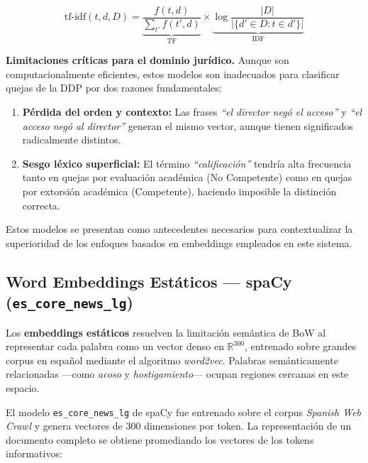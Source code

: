 \begin{equation}
  \text{tf-idf}(t, d, D)
  = \underbrace{\frac{f(t, d)}{\sum_{t'} f(t', d)}}_{\text{TF}}
    \times
    \underbrace{\log \frac{|D|}{|\{d' \in D : t \in d'\}|}}_{\text{IDF}}
  \label{eq:tfidf}
\end{equation}

\noindent\textbf{Limitaciones críticas para el dominio jurídico.} Aunque son
computacionalmente eficientes, estos modelos son inadecuados para clasificar
quejas de la DDP por dos razones fundamentales:

\begin{enumerate}
  \item \textbf{Pérdida del orden y contexto:} Las frases \textit{``el director
        negó el acceso''} y \textit{``el acceso negó al director''} generan el
        mismo vector, aunque tienen significados radicalmente distintos.
  \item \textbf{Sesgo léxico superficial:} El término \textit{``calificación''}
        tendría alta frecuencia tanto en quejas por evaluación académica (No
        Competente) como en quejas por extorsión académica (Competente), haciendo
        imposible la distinción correcta.
\end{enumerate}

Estos modelos se presentan como antecedentes necesarios para contextualizar la
superioridad de los enfoques basados en embeddings empleados en este sistema.

\subsection{Word Embeddings Estáticos — spaCy (\texttt{es\_core\_news\_lg})}

Los \textbf{embeddings estáticos} resuelven la limitación semántica de BoW al
representar cada palabra como un vector denso en $\mathbb{R}^{300}$, entrenado
sobre grandes corpus en español mediante el algoritmo \textit{word2vec}.\cite{mikolov2013} Palabras
semánticamente relacionadas —como \textit{acoso} y \textit{hostigamiento}—
ocupan regiones cercanas en este espacio.

El modelo \texttt{es\_core\_news\_lg} de spaCy  \cite{honnibal2020} fue entrenado sobre el corpus
\textit{Spanish Web Crawl} y genera vectores de 300 dimensiones por token. La
representación de un documento completo se obtiene promediando los vectores de
los tokens informativos:

